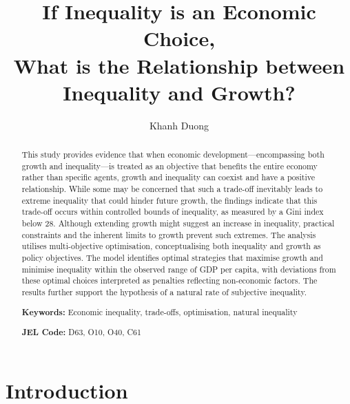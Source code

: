\documentclass[12pt]{article}
\title{If Inequality is an Economic Choice,\\What is the Relationship between Inequality and Growth?}
\author[1,+]{Khanh Duong}
\affil[1]{\small UNU-MERIT, Maastricht, The Netherlands}
\affil[+]{\small Corresponding author: duong@merit.unu.edu}
\date{} %
\begin{document}
\maketitle

\begin{abstract}
\noindent This study provides evidence that when economic development—encompassing both growth and inequality—is treated as an objective that benefits the entire economy rather than specific agents, growth and inequality can coexist and have a positive relationship. While some may be concerned that such a trade-off inevitably leads to extreme inequality that could hinder future growth, the findings indicate that this trade-off occurs within controlled bounds of inequality, as measured by a Gini index below 28. Although extending growth might suggest an increase in inequality, practical constraints and the inherent limits to growth prevent such extremes. The analysis utilises multi-objective optimisation, conceptualising both inequality and growth as policy objectives. The model identifies optimal strategies that maximise growth and minimise inequality within the observed range of GDP per capita, with deviations from these optimal choices interpreted as penalties reflecting non-economic factors. The results further support the hypothesis of a natural rate of subjective inequality.


\medskip
\textbf{Keywords:} Economic inequality, trade-offs, optimisation, natural inequality

\textbf{JEL Code:} D63, O10, O40, C61 

\end{abstract}
\newpage

\section{Introduction}
\end{document}
